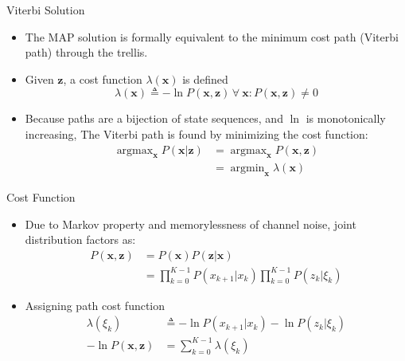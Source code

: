 \documentclass[xetex,mathserif,serif]{beamer}
\DeclareMathOperator*{\argmax}{argmax}
\DeclareMathOperator*{\argmin}{argmin}
\begin{document}
\begin{frame}{Viterbi Solution}
    \begin{itemize}
    \item The MAP solution is formally equivalent to the minimum cost path
          (Viterbi path) through the trellis.
    \item Given $\mathbf z$, a cost function $\lambda(\mathbf x)$ is defined
        \begin{equation}
        \lambda(\mathbf x) \triangleq -\ln P(\mathbf x, \mathbf z)\,
        \forall\ \mathbf x : P(\mathbf x, \mathbf z) \ne 0
        \end{equation}

    \item Because paths are a bijection of state sequences, and $\ln$ is
          monotonically increasing, The Viterbi path is found by minimizing the
          cost function:
        \begin{equation}
            \begin{aligned}
            \argmax_{\mathbf x} P(\mathbf x | \mathbf z) &= \argmax_{\mathbf x}
            P(\mathbf x , \mathbf z)\\
            &= \argmin_{\mathbf x} \lambda(\mathbf x)
            \end{aligned}
        \end{equation}
    \end{itemize}
\end{frame}

\begin{frame}{Cost Function}
    \begin{itemize}
    \item Due to Markov property and memorylessness of channel noise, joint
          distribution factors as:
    \begin{equation}
    \begin{aligned}
    P(\mathbf x, \mathbf z) &= P(\mathbf x) P(\mathbf z | \mathbf x)\\
    &= \prod_{k=0}^{K-1} P(x_{k+1} | x_k) \prod_{k=0}^{K-1} P(z_k | \xi_k)
    \end{aligned}
    \end{equation}

    \item Assigning path cost function
    \begin{equation}
    \begin{aligned}
    \lambda(\xi_k) &\triangleq - \ln P(x_{k+1} | x_k) - \ln P(z_k | \xi_k)\\
    -\ln P(\mathbf x , \mathbf z) &= \sum_{k=0}^{K-1} \lambda(\xi_k)
    \end{aligned}
    \end{equation}
    \end{itemize}
\end{frame}
\end{document}
